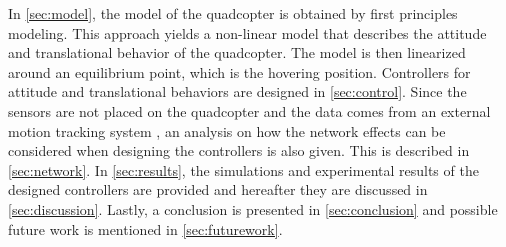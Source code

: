 In \autoref{sec:model}, the model of the quadcopter is obtained by first principles modeling. This approach yields a non-linear model that describes the attitude and translational behavior of the quadcopter. The model is then linearized around an equilibrium point, which is the hovering position. 
%
Controllers for attitude and translational behaviors are designed in \autoref{sec:control}.%
%
 Since the sensors are not placed on the quadcopter and the data comes from an external motion tracking system \cite{vicon}, an analysis on how the network effects can be considered when designing the controllers is also given. This is described in \autoref{sec:network}.
%
In \autoref{sec:results}, the simulations and experimental results of the designed controllers are provided and hereafter they are discussed in \autoref{sec:discussion}. Lastly, a conclusion is presented in \autoref{sec:conclusion} and possible future work is mentioned in \autoref{sec:futurework}. 